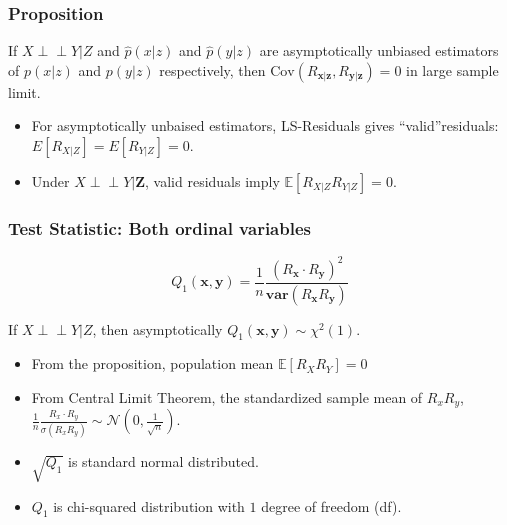 \documentclass{beamer}
\def\ci{\perp\!\!\!\!\!\perp}
\begin{document}
\begin{frame}
	\frametitle{Proposition}
	If $ X \ci Y | Z $ and $ \hat{p}(x|z) $ and $ \hat{p}(y|z) $ are asymptotically
	unbiased estimators of $ p(x|z) $ and $ p(y|z) $ respectively, then 
	$ \mathrm{Cov}(R_{\bm{x}|\bm{z}}, R_{\bm{y}|\bm{z}}) = 0 $ in large sample limit.	
	\vspace{1em}

	\begin{itemize}
		\setlength\itemsep{1em}
		\item For asymptotically unbaised estimators, LS-Residuals
			gives ``valid''residuals: $ E[R_{X|Z}] = E[R_{Y|Z}] = 0
			$.
		\item Under $ X \ci Y | \bm{Z} $, valid
			residuals imply $ \mathbb{E}[R_{X|Z} R_{Y|Z}] = 0 $.
	\end{itemize}
\end{frame}

\begin{frame}
	\frametitle{Test Statistic: Both ordinal variables}
	$$ Q_1(\bm{x}, \bm{y}) = \frac{1}{n} \frac{(R_{\bm{x}} \cdot R_{\bm{y}})^2}{\bm{var}(R_{\bm{x}} R_{\bm{y}})} $$

	If $ X \ci Y | Z $, then asymptotically $ Q_1(\bm{x}, \bm{y}) \sim \chi^2(1) $.

	\begin{itemize}
		\setlength\itemsep{1em}
		\item From the proposition, population mean $ \mathbb{E}[R_X R_Y] = 0 $
		\item From Central Limit Theorem, the standardized sample mean of $ R_x R_y $, $ \frac{1}{n} \frac{R_x \cdot R_y}{\sigma(R_xR_y)} \sim \mathcal{N}(0, \frac{1}{\sqrt{n}}) $.
		\item $ \sqrt{Q_1} $ is standard normal distributed.
		\item $ Q_1 $ is chi-squared distribution with $ 1 $ degree of freedom (df).
	\end{itemize}
\end{frame}
\end{document}

